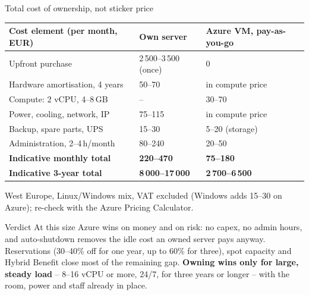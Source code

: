 \documentclass[aspectratio=169,xcolor=dvipsnames]{beamer}
\begin{document}
\begin{frame}[shrink=15]{Total cost of ownership, not sticker price}
	\centering
	\renewcommand{\arraystretch}{1.2}
	\setlength{\tabcolsep}{4pt}
	\footnotesize
	
	\begin{tabular}{@{} L{4.9cm} L{2.9cm} L{3.2cm} @{}}
		\toprule
		\textbf{Cost element (per month, EUR)} & \textbf{Own server} & \textbf{Azure VM, pay-as-you-go} \\
		\midrule
		Upfront purchase & 2\,500--3\,500 (once) & 0 \\
		Hardware amortisation, 4 years & 50--70 & in compute price \\
		Compute: 2 vCPU, 4--8\,GB & -- & 30--70 \\
		Power, cooling, network, IP & 75--115 & in compute price \\
		Backup, spare parts, UPS & 15--30 & 5--20 (storage) \\
		Administration, 2--4\,h/month & 80--240 & 20--50 \\
		\midrule
		\textbf{Indicative monthly total} & \textbf{220--470} & \textbf{75--180} \\
		\textbf{Indicative 3-year total} & \textbf{8\,000--17\,000} & \textbf{2\,700--6\,500} \\
		\bottomrule
	\end{tabular}
	
	\vspace{0.15cm}
	{\scriptsize West Europe, Linux/Windows mix, VAT excluded (Windows adds 15--30 on Azure); re-check with the Azure Pricing Calculator.}
	
	\vspace{0.15cm}
	\begin{block}{Verdict}
		{\footnotesize
		At this size Azure wins on money and on risk: no capex, no admin hours, and auto-shutdown removes the idle cost an owned server pays anyway. Reservations (30--40\% off for one year, up to 60\% for three), spot capacity and Hybrid Benefit close most of the remaining gap. \textbf{Owning wins only for large, steady load} -- 8--16 vCPU or more, 24/7, for three years or longer -- with the room, power and staff already in place.}
	\end{block}
\end{frame}
\end{document}
